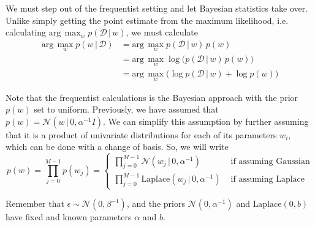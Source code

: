   We must step out of the frequentist setting and let Bayesian statistics take over. Unlike simply getting the point estimate from the maximum likelihood, i.e. calculating $\text{arg}\, \max_w p(\mathcal{D}\,|\,w)$, we must calculate
  \begin{align*}
    \text{arg}\, \max_w p(w\,|\,\mathcal{D}) & = \text{arg}\, \max_w p(\mathcal{D}\,|\, w)\, p(w) \\
    & = \text{arg}\, \max_w \log\big(p(\mathcal{D}\,|\, w)\, p(w)) \\
    & = \text{arg}\, \max_w \Big( \log{p(\mathcal{D}\,|\,w)} + \log{p(w)} \Big)
  \end{align*}

  Note that the frequentist calculations is the Bayesian approach with the prior $p(w)$ set to uniform. Previously, we have assumed that $p(w) = \mathcal{N}(w\,|\, 0, \alpha^{-1} I)$. We can simplify this assumption by further assuming that it is a product of univariate distributions for each of its parameters $w_i$, which can be done with a change of basis. So, we will write
  \begin{equation}
    p(w) = \prod_{j=0}^{M-1} p(w_j) = \begin{cases}
      \prod_{j=0}^{M-1} \mathcal{N}(w_j \,|\,0, \alpha^{-1}) & \text{ if assuming Gaussian} \\
      \prod_{j=0}^{M-1} \text{Laplace}(w_j \,|\,0, \alpha^{-1}) & \text{ if assuming Laplace}
    \end{cases}
  \end{equation}

  Remember that $\epsilon \sim \mathcal{N}(0, \beta^{-1})$, and the priors $\mathcal{N}(0, \alpha^{-1})$ and $\text{Laplace}(0, b)$ have fixed and known parameters $\alpha$ and $b$.

